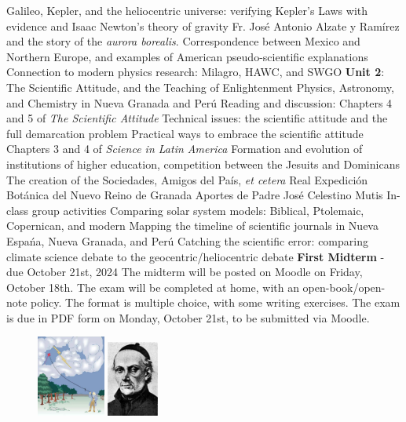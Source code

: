 \documentclass[10pt]{article}
\begin{document}
\begin{outline}[enumerate]
\3 Galileo, Kepler, and the heliocentric universe: verifying Kepler's Laws with evidence and Isaac Newton's theory of gravity
\3 Fr. Jos\'{e} Antonio Alzate y Ramírez and the story of the \textit{aurora borealis}.  Correspondence between Mexico and Northern Europe, and examples of American pseudo-scientific explanations
\3 Connection to modern physics research: Milagro, HAWC, and SWGO
\1 \textbf{Unit 2}: The Scientific Attitude, and the Teaching of Enlightenment Physics, Astronomy, and Chemistry in Nueva Granada and Per\'{u}
\2 Reading and discussion:
\3 Chapters 4 and 5 of \textit{The Scientific Attitude}
\4 Technical issues: the scientific attitude and the full demarcation problem
\4 Practical ways to embrace the scientific attitude
\3 Chapters 3 and 4 of \textit{Science in Latin America}
\4 Formation and evolution of institutions of higher education, competition between the Jesuits and Dominicans
\4 The creation of the Sociedades, Amigos del Pa\'{i}s, \textit{et cetera}
\4 Real Expedici\'{o}n Bot\'{a}nica del Nuevo Reino de Granada
\4 Aportes de Padre Jos\'{e} Celestino Mutis
\2 In-class group activities
\3 Comparing solar system models: Biblical, Ptolemaic, Copernican, and modern
\3 Mapping the timeline of scientific journals in Nueva Espa\'{n}a, Nueva Granada, and Per\'{u}
\3 Catching the scientific error: comparing climate science debate to the geocentric/heliocentric debate
\1 \textbf{First Midterm} - due October 21st, 2024
\2 The midterm will be posted on Moodle on Friday, October 18th.
\2 The exam will be completed at home, with an open-book/open-note policy.  The format is multiple choice, with some writing exercises.
\2 The exam is due in PDF form on Monday, October 21st, to be submitted via Moodle.
\begin{figure}[hb]
\centering
\includegraphics[width=0.20\textwidth]{figures/franklin.png}
\includegraphics[width=0.15\textwidth]{figures/alzate_ramirez.jpg} \\

\end{figure}
\end{outline}
\end{document}
